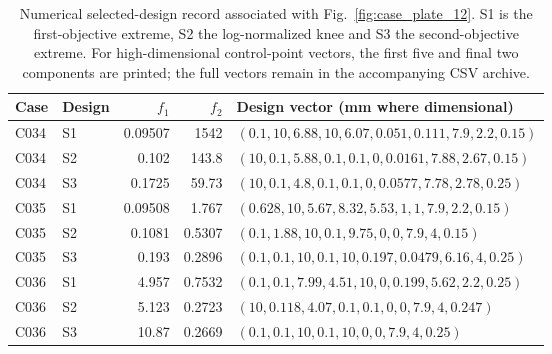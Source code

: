 \begin{table}[p]
\centering\scriptsize
\caption{Numerical selected-design record associated with Fig.~\ref{fig:case_plate_12}. S1 is the first-objective extreme, S2 the log-normalized knee and S3 the second-objective extreme. For high-dimensional control-point vectors, the first five and final two components are printed; the full vectors remain in the accompanying CSV archive.}
\label{tab:case_plate_12}
\setlength{\tabcolsep}{3.2pt}
\begin{tabularx}{\textwidth}{llrr>{\raggedright\arraybackslash}X}
\toprule Case & Design & $f_1$ & $f_2$ & Design vector (mm where dimensional) \\
\midrule
C034 & S1 & 0.09507 & 1542 & $(0.1, 10, 6.88, 10, 6.07, 0.051, 0.111, 7.9, 2.2, 0.15)$ \\
C034 & S2 & 0.102 & 143.8 & $(10, 0.1, 5.88, 0.1, 0.1, 0, 0.0161, 7.88, 2.67, 0.15)$ \\
C034 & S3 & 0.1725 & 59.73 & $(10, 0.1, 4.8, 0.1, 0.1, 0, 0.0577, 7.78, 2.78, 0.25)$ \\
C035 & S1 & 0.09508 & 1.767 & $(0.628, 10, 5.67, 8.32, 5.53, 1, 1, 7.9, 2.2, 0.15)$ \\
C035 & S2 & 0.1081 & 0.5307 & $(0.1, 1.88, 10, 0.1, 9.75, 0, 0, 7.9, 4, 0.15)$ \\
C035 & S3 & 0.193 & 0.2896 & $(0.1, 0.1, 10, 0.1, 10, 0.197, 0.0479, 6.16, 4, 0.25)$ \\
C036 & S1 & 4.957 & 0.7532 & $(0.1, 0.1, 7.99, 4.51, 10, 0, 0.199, 5.62, 2.2, 0.25)$ \\
C036 & S2 & 5.123 & 0.2723 & $(10, 0.118, 4.07, 0.1, 0.1, 0, 0, 7.9, 4, 0.247)$ \\
C036 & S3 & 10.87 & 0.2669 & $(0.1, 0.1, 10, 0.1, 10, 0, 0, 7.9, 4, 0.25)$ \\
\bottomrule
\end{tabularx}
\end{table}
